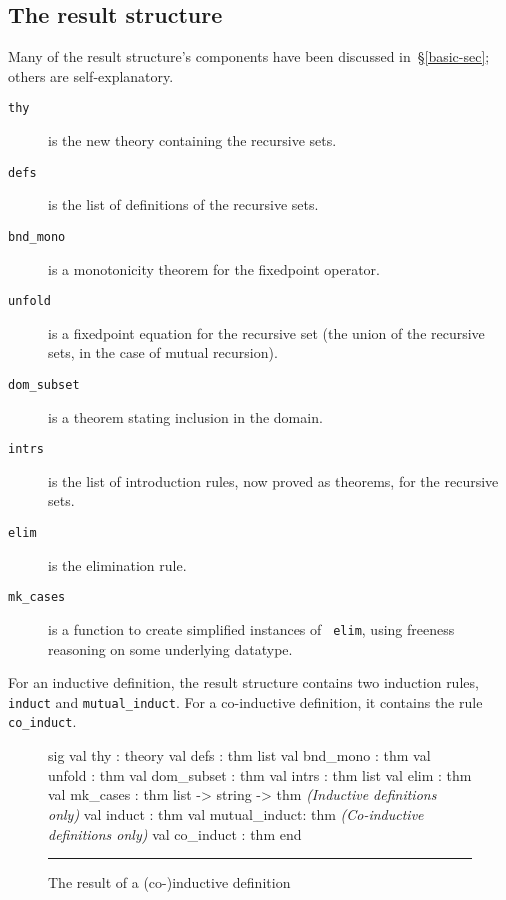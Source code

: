 \subsection{The result structure}
Many of the result structure's components have been discussed
in~\S\ref{basic-sec}; others are self-explanatory.
\begin{description}
\item[\tt thy] is the new theory containing the recursive sets.

\item[\tt defs] is the list of definitions of the recursive sets.

\item[\tt bnd\_mono] is a monotonicity theorem for the fixedpoint operator.

\item[\tt unfold] is a fixedpoint equation for the recursive set (the union of
the recursive sets, in the case of mutual recursion).

\item[\tt dom\_subset] is a theorem stating inclusion in the domain.

\item[\tt intrs] is the list of introduction rules, now proved as theorems, for
the recursive sets.

\item[\tt elim] is the elimination rule.

\item[\tt mk\_cases] is a function to create simplified instances of {\tt
elim}, using freeness reasoning on some underlying datatype.
\end{description}

For an inductive definition, the result structure contains two induction rules,
{\tt induct} and \verb|mutual_induct|.  For a co-inductive definition, it
contains the rule \verb|co_induct|.

\begin{figure}
\begin{ttbox}
sig
val thy          : theory
val defs         : thm list
val bnd_mono     : thm
val unfold       : thm
val dom_subset   : thm
val intrs        : thm list
val elim         : thm
val mk_cases     : thm list -> string -> thm
{\it(Inductive definitions only)} 
val induct       : thm
val mutual_induct: thm
{\it(Co-inductive definitions only)}
val co_induct    : thm
end
\end{ttbox}
\hrule
\caption{The result of a (co-)inductive definition} \label{def-result-fig}
\end{figure}

